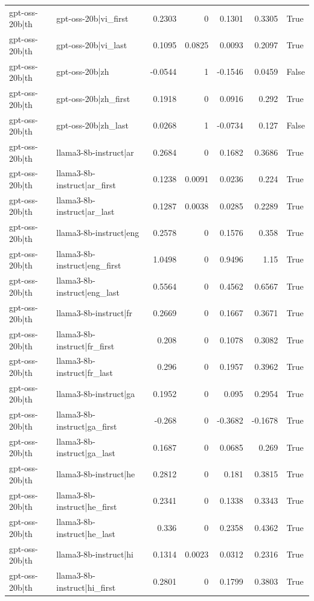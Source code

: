 \begin{table}
\begin{tabular}{l l r r r r l}
gpt-oss-20b|th & gpt-oss-20b|vi_first & 0.2303 & 0 & 0.1301 & 0.3305 & True \\
gpt-oss-20b|th & gpt-oss-20b|vi_last & 0.1095 & 0.0825 & 0.0093 & 0.2097 & True \\
gpt-oss-20b|th & gpt-oss-20b|zh & -0.0544 & 1 & -0.1546 & 0.0459 & False \\
gpt-oss-20b|th & gpt-oss-20b|zh_first & 0.1918 & 0 & 0.0916 & 0.292 & True \\
gpt-oss-20b|th & gpt-oss-20b|zh_last & 0.0268 & 1 & -0.0734 & 0.127 & False \\
gpt-oss-20b|th & llama3-8b-instruct|ar & 0.2684 & 0 & 0.1682 & 0.3686 & True \\
gpt-oss-20b|th & llama3-8b-instruct|ar_first & 0.1238 & 0.0091 & 0.0236 & 0.224 & True \\
gpt-oss-20b|th & llama3-8b-instruct|ar_last & 0.1287 & 0.0038 & 0.0285 & 0.2289 & True \\
gpt-oss-20b|th & llama3-8b-instruct|eng & 0.2578 & 0 & 0.1576 & 0.358 & True \\
gpt-oss-20b|th & llama3-8b-instruct|eng_first & 1.0498 & 0 & 0.9496 & 1.15 & True \\
gpt-oss-20b|th & llama3-8b-instruct|eng_last & 0.5564 & 0 & 0.4562 & 0.6567 & True \\
gpt-oss-20b|th & llama3-8b-instruct|fr & 0.2669 & 0 & 0.1667 & 0.3671 & True \\
gpt-oss-20b|th & llama3-8b-instruct|fr_first & 0.208 & 0 & 0.1078 & 0.3082 & True \\
gpt-oss-20b|th & llama3-8b-instruct|fr_last & 0.296 & 0 & 0.1957 & 0.3962 & True \\
gpt-oss-20b|th & llama3-8b-instruct|ga & 0.1952 & 0 & 0.095 & 0.2954 & True \\
gpt-oss-20b|th & llama3-8b-instruct|ga_first & -0.268 & 0 & -0.3682 & -0.1678 & True \\
gpt-oss-20b|th & llama3-8b-instruct|ga_last & 0.1687 & 0 & 0.0685 & 0.269 & True \\
gpt-oss-20b|th & llama3-8b-instruct|he & 0.2812 & 0 & 0.181 & 0.3815 & True \\
gpt-oss-20b|th & llama3-8b-instruct|he_first & 0.2341 & 0 & 0.1338 & 0.3343 & True \\
gpt-oss-20b|th & llama3-8b-instruct|he_last & 0.336 & 0 & 0.2358 & 0.4362 & True \\
gpt-oss-20b|th & llama3-8b-instruct|hi & 0.1314 & 0.0023 & 0.0312 & 0.2316 & True \\
gpt-oss-20b|th & llama3-8b-instruct|hi_first & 0.2801 & 0 & 0.1799 & 0.3803 & True \\

\end{tabular}
\end{table}
